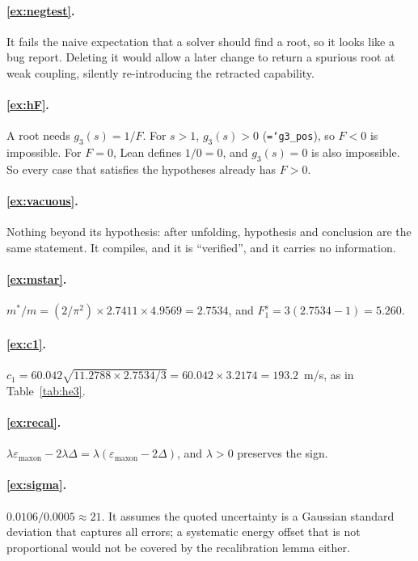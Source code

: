 \documentclass[11pt,a4paper,openany]{book}
\newcommand{\Fos}{F_1^{s}}
\newcommand{\code}[1]{\texttt{\hyphenchar\font=`\-\relax #1}}
\theoremstyle{definition}
\theoremstyle{plain}
\begin{document}
\paragraph{\ref{ex:negtest}.} It fails the naive expectation that a solver should find a root, so
it looks like a bug report. Deleting it would allow a later change to return a spurious root at
weak coupling, silently re-introducing the retracted capability.

\paragraph{\ref{ex:hF}.} A root needs $g_3(s)=1/F$. For $s>1$, $g_3(s)>0$ (\code{g3\_pos}), so
$F<0$ is impossible. For $F=0$, Lean defines $1/0=0$, and $g_3(s)=0$ is also impossible. So every
case that satisfies the hypotheses already has $F>0$.

\paragraph{\ref{ex:vacuous}.} Nothing beyond its hypothesis: after unfolding, hypothesis and
conclusion are the same statement. It compiles, and it is ``verified'', and it carries no
information.

\paragraph{\ref{ex:mstar}.} $m^*/m=(2/\pi^2)\times2.7411\times4.9569=2.7534$, and
$\Fos=3(2.7534-1)=5.260$.

\paragraph{\ref{ex:c1}.} $c_1=60.042\sqrt{11.2788\times2.7534/3}=60.042\times3.2174=193.2$~m/s,
as in Table~\ref{tab:he3}.

\paragraph{\ref{ex:recal}.} $\lambda\varepsilon_{\text{maxon}}-2\lambda\Delta
=\lambda(\varepsilon_{\text{maxon}}-2\Delta)$, and $\lambda>0$ preserves the sign.

\paragraph{\ref{ex:sigma}.} $0.0106/0.0005\approx21$. It assumes the quoted uncertainty is a
Gaussian standard deviation that captures all errors; a systematic energy offset that is not
proportional would not be covered by the recalibration lemma either.
\end{document}
